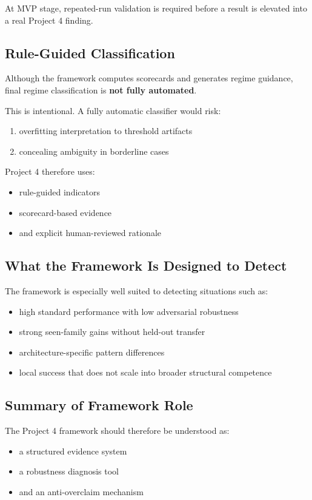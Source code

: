 \documentclass[11pt]{article}
\begin{document}
At MVP stage, repeated-run validation is required before a result is elevated into a real Project 4 finding.

\subsection{Rule-Guided Classification}

Although the framework computes scorecards and generates regime guidance, final regime classification is \textbf{not fully automated}.

This is intentional. A fully automatic classifier would risk:
\begin{enumerate}[leftmargin=1.5em]
    \item overfitting interpretation to threshold artifacts
    \item concealing ambiguity in borderline cases
\end{enumerate}

Project 4 therefore uses:
\begin{itemize}[leftmargin=1.5em]
    \item rule-guided indicators
    \item scorecard-based evidence
    \item and explicit human-reviewed rationale
\end{itemize}

\subsection{What the Framework Is Designed to Detect}

The framework is especially well suited to detecting situations such as:
\begin{itemize}[leftmargin=1.5em]
    \item high standard performance with low adversarial robustness
    \item strong seen-family gains without held-out transfer
    \item architecture-specific pattern differences
    \item local success that does not scale into broader structural competence
\end{itemize}

\subsection{Summary of Framework Role}

The Project 4 framework should therefore be understood as:
\begin{itemize}[leftmargin=1.5em]
    \item a structured evidence system
    \item a robustness diagnosis tool
    \item and an anti-overclaim mechanism
\end{itemize}
\end{document}
